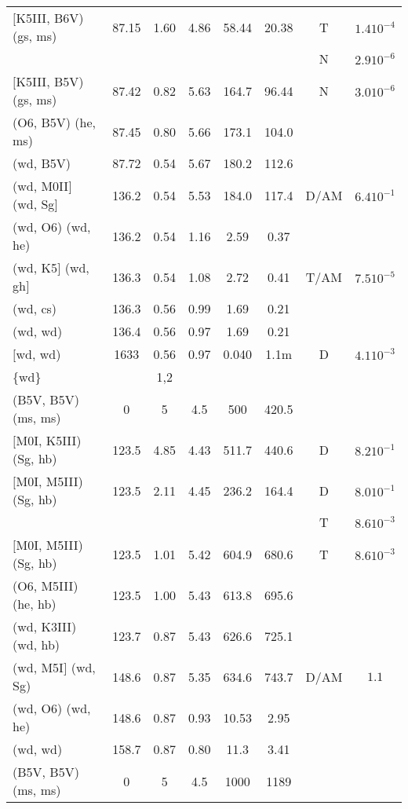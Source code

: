 \documentclass{article}
\begin{document}
\begin{table}
\begin{tabular}{p{4cm}ccccccc}
$[$K5III, B6V) (gs, ms)	& 87.15	& 1.60	& 4.86	& 58.44	& 20.38	& T	& $1.4 10^{-4}$		\\
			&	& 	&	&	&	& N	& $2.9 10^{-6}$		\\
$[$K5III, B5V) (gs, ms)	& 87.42	& 0.82	& 5.63	& 164.7	& 96.44	& N	& $3.0 10^{-6}$		\\
(O6, B5V) (he, ms)	& 87.45	& 0.80	& 5.66	& 173.1	& 104.0	& 	&              		\\
(wd, B5V)         	& 87.72	& 0.54	& 5.67	& 180.2	& 112.6	& 	&              		\\
(wd, M0II$]$ (wd, Sg$]$	& 136.2	& 0.54	& 5.53	& 184.0	& 117.4	& D/AM	& $6.4 10^{-1}$		\\
(wd, O6) (wd, he)	& 136.2	& 0.54	& 1.16	& 2.59 	& 0.37 	& 	&              		\\
(wd, K5$]$ (wd, gh$]$	& 136.3	& 0.54	& 1.08	& 2.72 	& 0.41 	& T/AM	& $7.5 10^{-5}$		\\
(wd, cs)         	& 136.3	& 0.56	& 0.99	& 1.69 	& 0.21 	&     	&                	\\
(wd, wd)         	& 136.4	& 0.56	& 0.97	& 1.69 	& 0.21 	&     	&                	\\
$[$wd, wd)         	& 1633 	& 0.56	& 0.97	& 0.040	& 1.1m 	& D   	& $4.1 10^{-3}$		\\ 
\{wd\}                  &       & 1,2   & \\
\hline
(B5V, B5V) (ms, ms)	& 0	& 5	& 4.5	& 500	& 420.5	&       &			\\
$[$M0I, K5III) (Sg, hb)	& 123.5	& 4.85	& 4.43	& 511.7	& 440.6	& D	& $8.2 10^{-1}$		\\
$[$M0I, M5III) (Sg, hb)	& 123.5	& 2.11	& 4.45	& 236.2	& 164.4	& D	& $8.0 10^{-1}$		\\
			&	& 	&	&	&	& T	& $8.6 10^{-3}$		\\
$[$M0I, M5III) (Sg, hb)	& 123.5	& 1.01	& 5.42	& 604.9	& 680.6	& T	& $8.6 10^{-3}$		\\
(O6, M5III) (he, hb)	& 123.5	& 1.00	& 5.43	& 613.8	& 695.6	& 	&              		\\
(wd, K3III) (wd, hb)	& 123.7	& 0.87	& 5.43	& 626.6	& 725.1	& 	&              		\\
(wd, M5I$]$ (wd, Sg)	& 148.6	& 0.87	& 5.35	& 634.6	& 743.7	& D/AM	& $1.1$			\\
(wd, O6) (wd, he)	& 148.6	& 0.87	& 0.93	& 10.53	& 2.95	& 	&              		\\
(wd, wd)         	& 158.7	& 0.87	& 0.80	& 11.3 	& 3.41	& 	&              		\\
\hline
(B5V, B5V) (ms, ms)	& 0	& 5	& 4.5	& 1000	& 1189	&       &			\\

\end{tabular}
\end{table}
\end{document}
